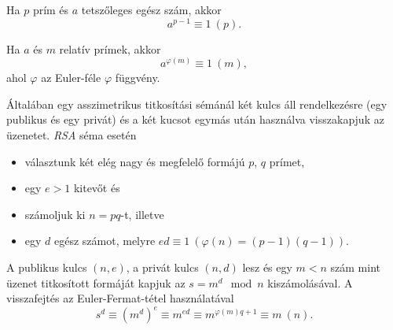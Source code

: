 
\begin{theorem}
  Ha $p$ prím és $a$ tetszőleges egész szám, akkor\[ a^{p-1}\equiv 1\ (p).\]
\end{theorem}

\begin{theorem}
  Ha $a$ és $m$ relatív prímek, akkor \[ a^{\varphi(m)}\equiv 1\ (m), \] ahol $\varphi$ az
  Euler-féle $\varphi$ függvény.
\end{theorem}

\begin{definition}
  Általában egy asszimetrikus titkosítási sémánál két kulcs áll rendelkezésre (egy publikus és egy
  privát) és a két kucsot egymás után használva visszakapjuk az üzenetet. \emph{RSA} séma esetén
  \begin{itemize}
    \item választunk két elég nagy és megfelelő formájú $p$, $q$ prímet,
    \item egy $e>1$ kitevőt és
    \item számoljuk ki $n=pq$-t, illetve
    \item egy $d$ egész számot, melyre $ed\equiv 1\ (\varphi(n)=(p-1)(q-1))$.
  \end{itemize}
  A publikus kulcs $(n,e)$, a privát kulcs $(n,d)$ lesz és egy $m<n$ szám mint üzenet titkosított
  formáját kapjuk az $s = m^d \mod n$ kiszámolásával. A visszafejtés az Euler-Fermat-tétel
  használatával \[ s^d\equiv (m^d)^e\equiv m^{ed}\equiv m^{\varphi(m)q+1}\equiv m\ (n). \]
\end{definition}

